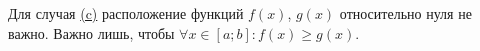 


\begin{remark}
  Для случая \hyperref[fig:int-square-3]{(c)} расположение функций
  \(f(x)\), \(g(x)\) относительно нуля не важно. Важно лишь, чтобы
  \(\forall x \in [a; b] \colon f(x) \ge g(x)\).
\end{remark}